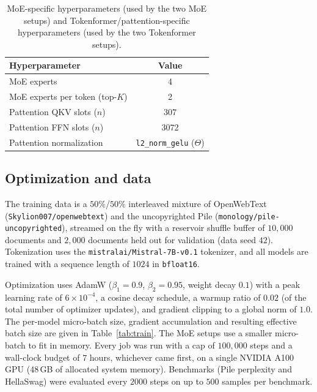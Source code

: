 \documentclass[twoside,11pt]{article}
\begin{document}
\begin{table}[h]
    \centering
    \begin{tabular}{|l|c|}
        \hline
        Hyperparameter & Value \\
        \hline\hline
        MoE experts & 4 \\
        \hline
        MoE experts per token (top-$K$) & 2 \\
        \hline
        Pattention QKV slots ($n$) & 307 \\
        \hline
        Pattention FFN slots ($n$) & 3072 \\
        \hline
        Pattention normalization & \texttt{l2\_norm\_gelu} ($\Theta$) \\
        \hline
    \end{tabular}
    \caption{MoE-specific hyperparameters (used by the two MoE setups) and
    Tokenformer/pattention-specific hyperparameters (used by the two Tokenformer
    setups).}
    \label{tab:arch_extra}
\end{table}

\subsection{Optimization and data}

The training data is a $50\%$/$50\%$ interleaved mixture of OpenWebText
(\texttt{Skylion007/openwebtext}) and the uncopyrighted Pile
(\texttt{monology/pile-uncopyrighted}), streamed on the fly with a reservoir
shuffle buffer of $10{,}000$ documents and $2{,}000$ documents held out for
validation (data seed $42$). Tokenization uses the
\texttt{mistralai/Mistral-7B-v0.1} tokenizer, and all models are trained with a
sequence length of $1024$ in \texttt{bfloat16}.

Optimization uses AdamW ($\beta_1 = 0.9$, $\beta_2 = 0.95$, weight decay $0.1$)
with a peak learning rate of $6 \times 10^{-4}$, a cosine decay schedule, a warmup
ratio of $0.02$ (of the total number of optimizer updates), and gradient clipping
to a global norm of $1.0$. The per-model micro-batch size, gradient accumulation
and resulting effective batch size are given in Table~\ref{tab:train}. The MoE
setups use a smaller micro-batch to fit in memory. Every job was run with a cap of
$100{,}000$ steps and a wall-clock budget of $7$ hours, whichever came first, on a
single NVIDIA A100 GPU (48\,GB of allocated system memory). Benchmarks
(Pile perplexity and HellaSwag) were evaluated every $2000$ steps on up to $500$
samples per benchmark.
\end{document}
